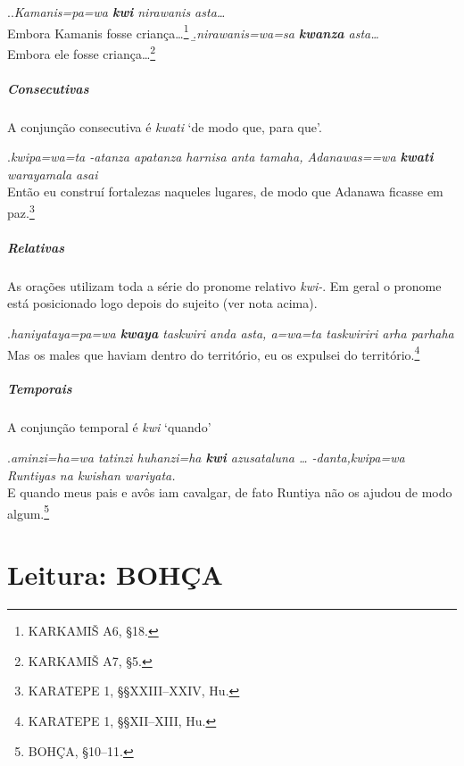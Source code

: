 \documentclass{luvita}
\begin{document}
\ex.\a.\emph{Kamanis=pa=wa \textbf{kwi} nirawanis asta\ldots{}}\\
Embora Kamanis fosse criança\ldots{}\footnote{KARKAMIŠ A6, §18.}
\b.\emph{nirawanis=wa=sa \textbf{kwanza} asta\ldots{}}\\
Embora ele fosse criança\ldots{}\footnote{KARKAMIŠ A7, §5.}


\paragraph{Consecutivas}
A conjunção consecutiva é \emph{kwati} `de modo que, para que'.

\ex.\emph{kwipa=wa=ta -atanza apatanza harnisa anta tamaha,
	Adanawas=\linebreak=wa
	\textbf{kwa\-ti} warayamala asai}\\
Então eu construí fortalezas naqueles lugares, de modo que Adanawa\linebreak
ficasse em paz.\footnote{KARATEPE 1, §§XXIII--XXIV, Hu.}

\paragraph{Relativas}
As orações utilizam toda a série do pronome relativo \emph{kwi-}.
Em geral o pronome está posicionado logo depois do sujeito (ver nota acima).

\ex.\emph{haniyataya=pa=wa \textbf{kwaya} taskwiri anda asta, a=wa=ta
	taskwiriri arha par\-haha}\\
Mas os males que haviam dentro do território, eu os expulsei do
território.\footnote{KARATEPE 1, §§XII--XIII, Hu.}

\paragraph{Temporais}
A conjunção temporal é \emph{kwi} `quando'

\ex.\emph{aminzi=ha=wa tatinzi huhanzi=ha \textbf{kwi} azusataluna {\ldots}
	-danta,\linebreak kwipa=wa Runtiyas na
	kwishan wariyata.}\\
E quando meus pais e avôs iam cavalgar, de fato Runtiya não
os ajudou de modo algum.\footnote{BOHÇA, §10--11.}

\clearpage



\chapter{Leitura: BOHÇA}
\end{document}
